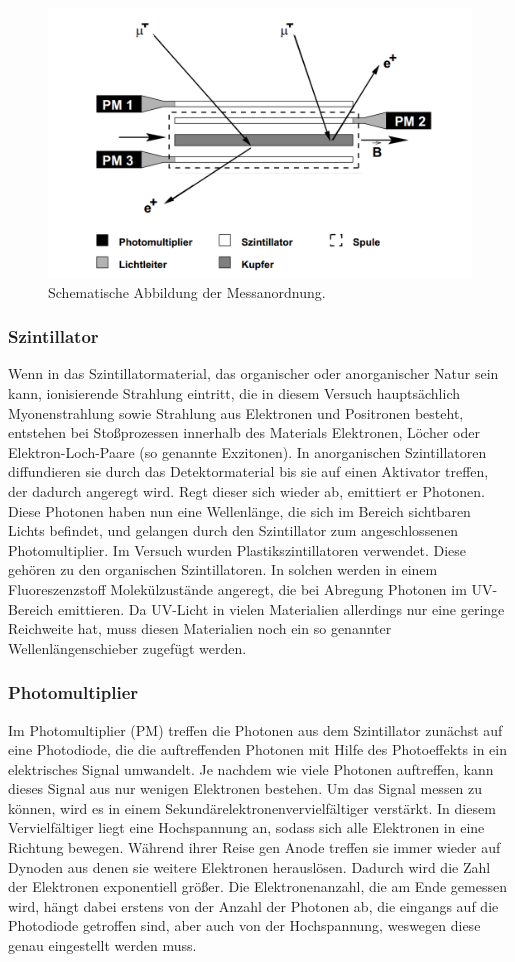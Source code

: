 \documentclass[slug=LM, room=Andreas-Schubert-Bau\,\ K\ 1A, supervisor=Anne-Sophie\ Berthold, coursedate=13.\ 12.\ 2019]{../../Lab_Report_LaTeX/lab_report}
\begin{document}
\begin{figure}[H]\centering
        \includegraphics[width=.5\columnwidth]{./Versuchsaufbau.png}
        \caption{Schematische Abbildung der Messanordnung.}
        \label{fig:aufbau}
\end{figure}

\subsubsection{Szintillator}
\label{sec:szinti}

Wenn in das Szintillatormaterial, das organischer oder anorganischer Natur sein kann, ionisierende
Strahlung eintritt, die in diesem Versuch hauptsächlich Myonenstrahlung sowie Strahlung
aus Elektronen und Positronen besteht, entstehen bei Stoßprozessen innerhalb des Materials Elektronen,
Löcher oder Elektron-Loch-Paare (so genannte Exzitonen).
In anorganischen Szintillatoren diffundieren sie durch das
Detektormaterial bis sie auf einen Aktivator treffen, der dadurch angeregt wird. Regt dieser sich
wieder ab, emittiert er Photonen. Diese Photonen haben nun eine Wellenlänge, die sich im Bereich
sichtbaren Lichts befindet, und gelangen durch den Szintillator zum angeschlossenen
Photomultiplier.
Im Versuch wurden Plastikszintillatoren verwendet. Diese gehören zu den organischen Szintillatoren.
In solchen werden in einem Fluoreszenzstoff Molekülzustände angeregt, die bei Abregung Photonen
im UV-Bereich emittieren. Da UV-Licht in vielen Materialien allerdings nur eine geringe
Reichweite hat, muss diesen Materialien noch ein so genannter Wellenlängenschieber zugefügt werden.

\subsubsection{Photomultiplier}
\label{sec:photomulti}

Im Photomultiplier (PM) treffen die Photonen aus dem Szintillator zunächst auf eine Photodiode,
die die auftreffenden Photonen mit Hilfe des Photoeffekts in ein elektrisches Signal umwandelt.
Je nachdem wie viele Photonen auftreffen, kann dieses Signal aus nur wenigen Elektronen bestehen.
Um das Signal messen zu können, wird es in einem Sekundärelektronenvervielfältiger verstärkt.
In diesem Vervielfältiger liegt eine Hochspannung an, sodass sich alle Elektronen in eine Richtung
bewegen. Während ihrer Reise gen Anode treffen sie immer wieder auf Dynoden aus denen sie
weitere Elektronen herauslösen. Dadurch wird die Zahl der Elektronen exponentiell größer.
Die Elektronenanzahl, die am Ende gemessen wird, hängt dabei erstens von der Anzahl der Photonen
ab, die eingangs auf die Photodiode getroffen sind, aber auch von der Hochspannung, weswegen diese
genau eingestellt werden muss.
\end{document}
